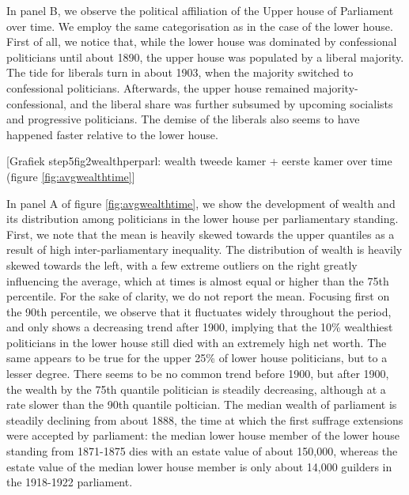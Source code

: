     In panel B, we observe the political affiliation of the Upper house of Parliament over time. We employ the same categorisation as in the case of the lower house. First of all, we notice that, while the lower house was dominated by confessional politicians until about 1890, the upper house was populated by a liberal majority. The tide for liberals turn in about 1903, when the majority switched to confessional politicians. Afterwards, the upper house remained majority-confessional, and the liberal share was further subsumed by upcoming socialists and progressive politicians. The demise of the liberals also seems to have happened faster relative to the lower house. 
    
\begin{center}    
    [Grafiek step5fig2wealthperparl: wealth tweede kamer + eerste kamer over time (figure \ref{fig:avgwealthtime}]
 \end{center}
 
    In panel A of figure \ref{fig:avgwealthtime}, we show the development of wealth and its distribution among politicians in the lower house per parliamentary standing. First, we note that the mean is heavily skewed towards the upper quantiles as a result of high inter-parliamentary inequality. The distribution of wealth is heavily skewed towards the left, with a few extreme outliers on the right greatly influencing the average, which at times is almost equal or higher than the 75th percentile. For the sake of clarity, we do not report the mean. Focusing first on the 90th percentile, we observe that it fluctuates widely throughout the period, and only shows a decreasing trend after 1900, implying that the 10\% wealthiest politicians in the lower house still died with an extremely high net worth. The same appears to be true for the upper 25\% of lower house politicians, but to a lesser degree. There seems to be no common trend before 1900, but after 1900, the wealth by the 75th quantile politician is steadily decreasing, although at a rate slower than the 90th quantile poltician.  The median wealth of parliament is steadily declining from about 1888, the time at which the first suffrage extensions were accepted by parliament: the median lower house member of the lower house standing from 1871-1875 dies with an estate value of about 150,000, whereas the estate value of the median lower house member is only about 14,000 guilders in the 1918-1922 parliament.
    
